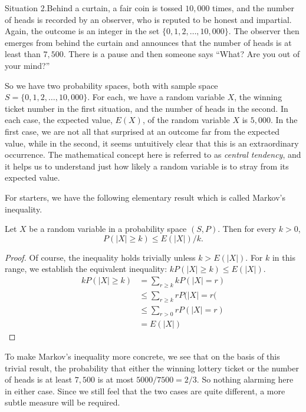 Situation 2.\quad Behind a curtain, a fair coin is tossed $10,000$ times, 
and the number of heads is recorded by an observer, who is reputed to
be honest and impartial.   Again, the outcome is an integer in the 
set $\{0,1,2,\dots,10,000\}$.  The observer then emerges from behind 
the curtain and announces that the number of heads is at least than $7,500$.  
There is a pause and then someone says ``What?  Are you out of your mind?''

So we have two probability spaces, both with
sample space $S=\{0,1,2,\dots,10,000\}$.  For each, we have a random
variable $X$, the winning ticket number in the first situation, and the
number of heads in the second.  In each case, the expected value, $E(X)$, of
the random variable $X$ is $5,000$.  In the first case, we are
not all that surprised at an outcome far from the expected value, while in the second,
it seems untuitively clear that this is an extraordinary occurrence.  The 
mathematical concept here is referred to as \textit{central tendency}, and it 
helps us to understand just how likely a random variable is to stray from its expected value.

For starters, we have the following elementary result which is
called Markov's inequality.

\begin{theorem}\label{thm:markov}
Let $X$ be a random variable in a probability
space $(S,P)$.  Then for every $k>0$,
\[
P(|X|\ge k) \le E(|X|)/k.
\]
\end{theorem}
\begin{proof}
Of course, the inequality holds trivially unless
$k> E(|X|)$.  For $k$ in this range, we
establish the equivalent inequality: $k P(|X|\ge k)\le E(|X|)$.
\begin{align*}
k P(|X|\ge k) &   = \sum_{r\ge k} k P(|X|=r)\\
              & \le \sum_{r \ge k} r P(|X|=r(\\
              & \le \sum_{r> 0} r P(|X|=r)\\
              &= E(|X|)
\end{align*}
\end{proof}

To make Markov's inequality more concrete, we see that on the
basis of this trivial  result, the probability that either the
winning lottery ticket or the number of heads is at least $7,500$
is at most $5000/7500=2/3$.  So nothing alarming here in either
case.  Since we still feel that the two cases are quite different,
a more subtle measure will be required.

